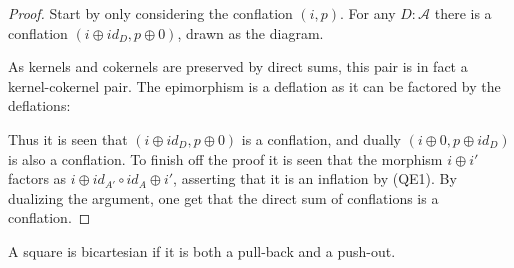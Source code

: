     \begin{proof}
        Start by only considering the conflation $(i,p)$. For any $D:\mathcal{A}$ there is a conflation $(i\oplus id_D, p\oplus 0)$, drawn as the diagram.
        \begin{center}
        \end{center}
        As kernels and cokernels are preserved by direct sums, this pair is in fact a kernel-cokernel pair. The epimorphism is a deflation as it can be factored by the deflations:
        \begin{center}
        \end{center}
        Thus it is seen that $(i\oplus id_D, p\oplus 0)$ is a conflation, and dually $(i\oplus 0, p\oplus id_D)$ is also a conflation. To finish off the proof it is seen that the morphism $i\oplus i'$ factors as $i\oplus id_{A'}\circ id_A\oplus i'$, asserting that it is an inflation by (QE1). By dualizing the argument, one get that the direct sum of conflations is a conflation.
    \end{proof}

    \begin{definition}
        A square is bicartesian if it is both a pull-back and a push-out.
    \end{definition}

